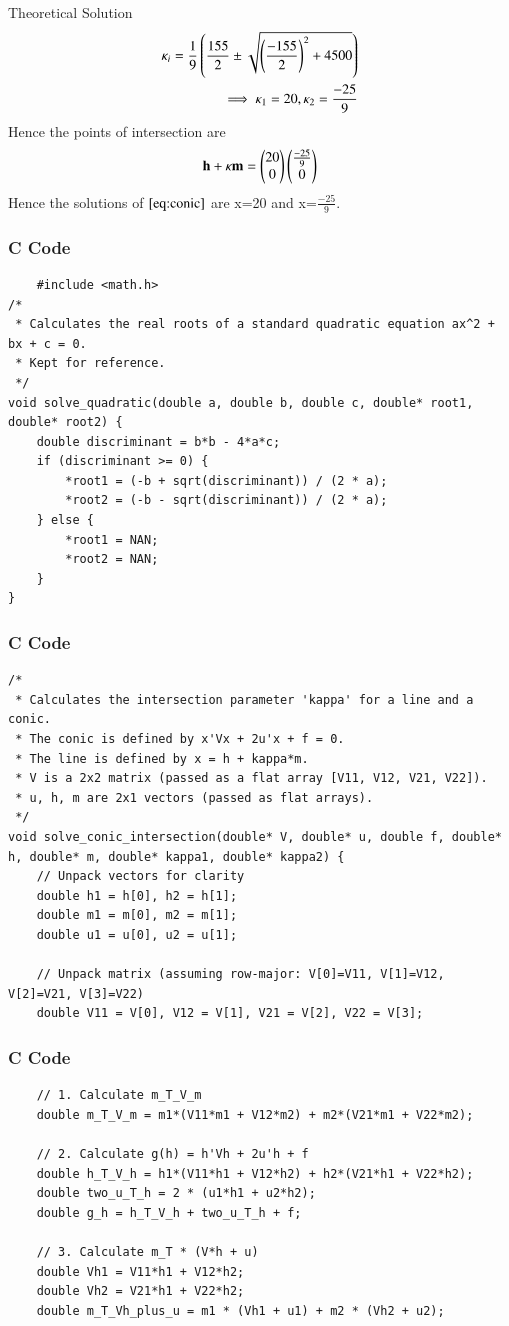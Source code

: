 \documentclass{beamer}
\begin{document}
\begin{frame}{Theoretical Solution}
\begin{align}
    \kappa_i=\frac{1}{9}\left(\frac{155}{2}\pm\sqrt{\left(\frac{-155}{2}\right)^{2}+4500}\right)\\
    \implies \kappa_1=20,\kappa_2=\frac{-25}{9}
\end{align}
Hence the points of intersection are
\begin{align}
    \mathbf{h}+\kappa\mathbf{m}=\begin{pmatrix}20\\0\end{pmatrix}\begin{pmatrix}\frac{-25}{9}\\0\end{pmatrix}
\end{align}
Hence the solutions of $\eqref{eq:conic}$ are x=20 and x=$\frac{-25}{9}$.
\end{frame}
\begin{frame}[fragile]
\frametitle{C Code}
\begin{lstlisting}
    #include <math.h>
/*
 * Calculates the real roots of a standard quadratic equation ax^2 + bx + c = 0.
 * Kept for reference.
 */
void solve_quadratic(double a, double b, double c, double* root1, double* root2) {
    double discriminant = b*b - 4*a*c;
    if (discriminant >= 0) {
        *root1 = (-b + sqrt(discriminant)) / (2 * a);
        *root2 = (-b - sqrt(discriminant)) / (2 * a);
    } else {
        *root1 = NAN;
        *root2 = NAN;
    }
}
\end{lstlisting}
\end{frame}
\begin{frame}[fragile]
\frametitle{C Code}
\begin{lstlisting}
/*
 * Calculates the intersection parameter 'kappa' for a line and a conic.
 * The conic is defined by x'Vx + 2u'x + f = 0.
 * The line is defined by x = h + kappa*m.
 * V is a 2x2 matrix (passed as a flat array [V11, V12, V21, V22]).
 * u, h, m are 2x1 vectors (passed as flat arrays).
 */
void solve_conic_intersection(double* V, double* u, double f, double* h, double* m, double* kappa1, double* kappa2) {
    // Unpack vectors for clarity
    double h1 = h[0], h2 = h[1];
    double m1 = m[0], m2 = m[1];
    double u1 = u[0], u2 = u[1];

    // Unpack matrix (assuming row-major: V[0]=V11, V[1]=V12, V[2]=V21, V[3]=V22)
    double V11 = V[0], V12 = V[1], V21 = V[2], V22 = V[3];
\end{lstlisting}
\end{frame}
\begin{frame}[fragile]
\frametitle{C Code}
\begin{lstlisting}
    // 1. Calculate m_T_V_m
    double m_T_V_m = m1*(V11*m1 + V12*m2) + m2*(V21*m1 + V22*m2);

    // 2. Calculate g(h) = h'Vh + 2u'h + f
    double h_T_V_h = h1*(V11*h1 + V12*h2) + h2*(V21*h1 + V22*h2);
    double two_u_T_h = 2 * (u1*h1 + u2*h2);
    double g_h = h_T_V_h + two_u_T_h + f;
    
    // 3. Calculate m_T * (V*h + u)
    double Vh1 = V11*h1 + V12*h2;
    double Vh2 = V21*h1 + V22*h2;
    double m_T_Vh_plus_u = m1 * (Vh1 + u1) + m2 * (Vh2 + u2);
\end{lstlisting}
\end{frame}
\end{document}

